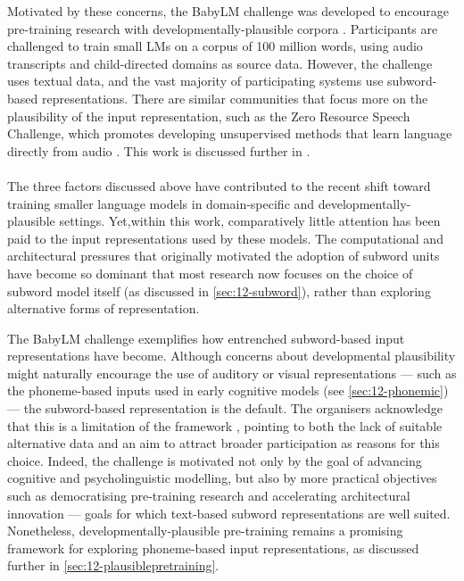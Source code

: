 Motivated by these concerns, the BabyLM challenge was developed to encourage pre-training research with developmentally-plausible corpora \citep{warstadt2023findings}. Participants are challenged to train small LMs on a corpus of 100 million words, using audio transcripts and child-directed domains as source data. However, the challenge uses textual data, and the vast majority of participating systems use subword-based representations. There are similar communities that focus more on the plausibility of the input representation, such as the Zero Resource Speech Challenge, which promotes developing unsupervised methods that learn language directly from audio \citep{dunbar_self-supervised_2022}. This work is discussed further in \writemore.

\paragraph{} The three factors discussed above have contributed to the recent shift toward training smaller language models in domain-specific and developmentally-plausible settings. Yet,within this work, comparatively little attention has been paid to the input representations used by these models. The computational and architectural pressures that originally motivated the adoption of subword units have become so dominant that most research now focuses on the choice of subword model itself (as discussed in \cref{sec:12-subword}), rather than exploring alternative forms of representation.

The BabyLM challenge exemplifies how entrenched subword-based input representations have become. Although concerns about developmental plausibility might naturally encourage the use of auditory or visual representations --- such as the phoneme-based inputs used in early cognitive models (see \cref{sec:12-phonemic}) --- the subword-based representation is the default. The organisers acknowledge that this is a limitation of the framework \citep{wilcox2025}, pointing to both the lack of suitable alternative data and an aim to attract broader participation as reasons for this choice. Indeed, the challenge is motivated not only by the goal of advancing cognitive and psycholinguistic modelling, but also by more practical objectives such as democratising pre-training research and accelerating architectural innovation --- goals for which text-based subword representations are well suited. Nonetheless, developmentally-plausible pre-training remains a promising framework for exploring phoneme-based input representations, as discussed further in \cref{sec:12-plausiblepretraining}.

